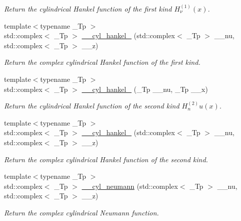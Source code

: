 \begin{DoxyCompactItemize}
\begin{DoxyCompactList}\small\item\em Return the cylindrical Hankel function of the first kind $ H^{(1)}_\nu(x) $. \end{DoxyCompactList}\item 
{\footnotesize template$<$typename \+\_\+\+Tp $>$ }\\std\+::complex$<$ \+\_\+\+Tp $>$ \hyperlink{namespacestd_1_1____detail_a9904b6007ef78ef777ac8345f6e47960}{\+\_\+\+\_\+cyl\+\_\+hankel\+\_} (std\+::complex$<$ \+\_\+\+Tp $>$ \+\_\+\+\_\+nu, std\+::complex$<$ \+\_\+\+Tp $>$ \+\_\+\+\_\+z)
\begin{DoxyCompactList}\small\item\em Return the complex cylindrical Hankel function of the first kind. \end{DoxyCompactList}\item 
{\footnotesize template$<$typename \+\_\+\+Tp $>$ }\\std\+::complex$<$ \+\_\+\+Tp $>$ \hyperlink{namespacestd_1_1____detail_a98615677d4042ef02fe2faf326f1a614}{\+\_\+\+\_\+cyl\+\_\+hankel\+\_} (\+\_\+\+Tp \+\_\+\+\_\+nu, \+\_\+\+Tp \+\_\+\+\_\+x)
\begin{DoxyCompactList}\small\item\em Return the cylindrical Hankel function of the second kind $ H^{(2)}_nu(x) $. \end{DoxyCompactList}\item 
{\footnotesize template$<$typename \+\_\+\+Tp $>$ }\\std\+::complex$<$ \+\_\+\+Tp $>$ \hyperlink{namespacestd_1_1____detail_a3a8bdfd85729c705dec2586dfa5b275b}{\+\_\+\+\_\+cyl\+\_\+hankel\+\_} (std\+::complex$<$ \+\_\+\+Tp $>$ \+\_\+\+\_\+nu, std\+::complex$<$ \+\_\+\+Tp $>$ \+\_\+\+\_\+z)
\begin{DoxyCompactList}\small\item\em Return the complex cylindrical Hankel function of the second kind. \end{DoxyCompactList}\item 
{\footnotesize template$<$typename \+\_\+\+Tp $>$ }\\std\+::complex$<$ \+\_\+\+Tp $>$ \hyperlink{namespacestd_1_1____detail_ac73a4e3b8ac311760c998277aadb0fcb}{\+\_\+\+\_\+cyl\+\_\+neumann} (std\+::complex$<$ \+\_\+\+Tp $>$ \+\_\+\+\_\+nu, std\+::complex$<$ \+\_\+\+Tp $>$ \+\_\+\+\_\+z)
\begin{DoxyCompactList}\small\item\em Return the complex cylindrical Neumann function. \end{DoxyCompactList}\item 

\end{DoxyCompactItemize}
